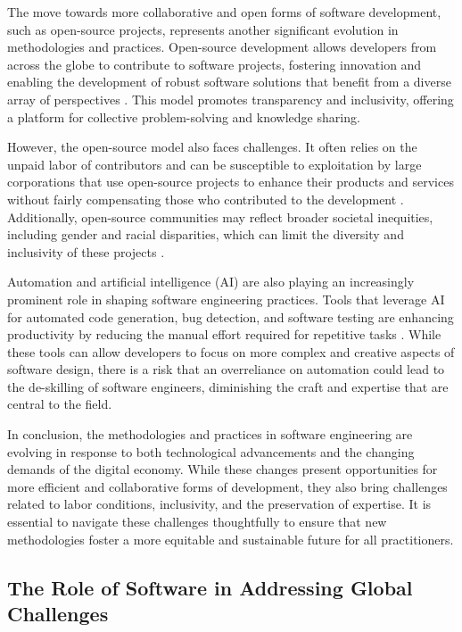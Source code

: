 \begin{refsection}
The move towards more collaborative and open forms of software development, such as open-source projects, represents another significant evolution in methodologies and practices. Open-source development allows developers from across the globe to contribute to software projects, fostering innovation and enabling the development of robust software solutions that benefit from a diverse array of perspectives \cite[pp.~45-48]{raymond2022cathedral}. This model promotes transparency and inclusivity, offering a platform for collective problem-solving and knowledge sharing.

However, the open-source model also faces challenges. It often relies on the unpaid labor of contributors and can be susceptible to exploitation by large corporations that use open-source projects to enhance their products and services without fairly compensating those who contributed to the development \cite[pp.~81-83]{eghbal2020working}. Additionally, open-source communities may reflect broader societal inequities, including gender and racial disparities, which can limit the diversity and inclusivity of these projects \cite[pp.~78-80]{reagle2012good}.

Automation and artificial intelligence (AI) are also playing an increasingly prominent role in shaping software engineering practices. Tools that leverage AI for automated code generation, bug detection, and software testing are enhancing productivity by reducing the manual effort required for repetitive tasks \cite[pp.~112-115]{noble2018algorithms}. While these tools can allow developers to focus on more complex and creative aspects of software design, there is a risk that an overreliance on automation could lead to the de-skilling of software engineers, diminishing the craft and expertise that are central to the field.

In conclusion, the methodologies and practices in software engineering are evolving in response to both technological advancements and the changing demands of the digital economy. While these changes present opportunities for more efficient and collaborative forms of development, they also bring challenges related to labor conditions, inclusivity, and the preservation of expertise. It is essential to navigate these challenges thoughtfully to ensure that new methodologies foster a more equitable and sustainable future for all practitioners.

\subsection{The Role of Software in Addressing Global Challenges}


\end{refsection}
